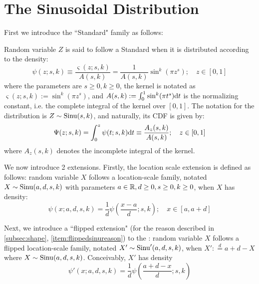
\section{The Sinusoidal Distribution}
First we introduce the ``Standard" \sindist{} family as follows:

Random variable $Z$ is said to follow a Standard \sindist{} when it is distributed according to the density:
\begin{equation}
    \boxed{\psi(z; s,k) \equiv \frac{\varsigma(z; s,k)}{A(s,k)} = \frac{1}{A(s,k)} \sin^k(\pi z^s); \quad z \in [0,1]}
\end{equation}
where the parameters are $s \ge 0, k \ge 0$, the kernel is notated as $\varsigma(z; s,k) := \sin^k(\pi z^s)$, and $A(s,k) := \int_0^1 \sin^k(\pi t^s) \mathrm d t$ is the normalizing constant, i.e. the complete integral of the kernel over $[0,1]$. The notation for the distribution is $Z \sim \operatorname*{Sinu}(s,k)$, and naturally, its CDF is given by:
\begin{equation}
    \Psi(z; s,k) = \int_0^z \psi(t; s,k) \mathrm d t \equiv \frac{A_z(s,k)}{A(s,k)}; \quad z\in[0,1]
\end{equation}
where $A_z(s,k)$ denotes the incomplete integral of the kernel.

We now introduce 2 extensions. Firstly, the location scale extension is defined as follows: random variable $X$ follows a location-scale \sindist{} family, notated $X \sim \operatorname*{Sinu}(a,d,s,k)$ with parameters $a \in \mathbb R, d \ge 0, s \ge 0, k\ge 0$, when $X$ has density:
\begin{equation}
    \psi(x; a,d,s,k) = {\frac 1 d} \psi \left( \frac{x-a}{d}; s,k \right);  \quad x \in [a, a+d]
\end{equation}

Next, we introduce a ``flipped extension" (for the reason described in \autoref{subsec:shape}, \autoref{item:flippedsinureason}) to the \sindist: random variable $X$ follows a flipped location-scale \sindist{} family, notated $X' \sim \operatorname*{Sinu}'(a,d,s,k)$, when $X' :\overset{d}{=} a+d - X$ where $X \sim \operatorname*{Sinu}(a,d,s,k)$. Conceivably, $X'$ has density
\begin{equation}
    \psi'(x; a,d,s,k) = {\frac 1 d} \psi \left( \frac{a+d-x}{d}; s,k \right)
\end{equation}

